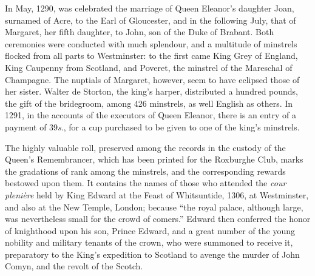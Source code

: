 In May, 1290, was celebrated the marriage of Queen Eleanor’s daughter Joan,
surnamed of Acre, to the Earl of Gloucester, and in the following July, that of
Margaret, her fifth daughter, to John, son of the Duke of Brabant. Both ceremonies
were conducted with much splendour, and a multitude of minstrels flocked
from all parts to Westminster: to the first came King Grey of England, King
Caupenny from Scotland, and Poveret, the minstrel of the Mareschal of Champagne.
The nuptials of Margaret, however, seem to have eclipsed those of her sister. 
Walter de Storton, the king’s harper, \pagebreak
distributed a hundred pounds, the gift of 
the bridegroom, among 426 minstrels, as well English as others. %
 In 1291, in the
accounts of the executors of Queen Eleanor, there is an entry of a payment of
39\textit{s}., for a cup purchased to be given to one of the king’s minstrels.



The highly valuable roll, preserved among the records in the custody of the
Queen’s Remembrancer, which has been printed for the Roxburghe Club, marks
the gradations of rank among the minstrels, and the corresponding rewards
bestowed upon them. It contains the names of those who attended the \textit{cour
plenière} held by King Edward at the Feast of Whitsuntide, 1306, at Westminster,
and also at the New Temple, London; because “the royal palace,
although large, was nevertheless small for the crowd of comers.” Edward then
conferred the honor of knighthood upon his son, Prince Edward, and a great
number of the young nobility and military tenants of the crown, who were summoned
to receive it, preparatory to the King’s expedition to Scotland to avenge
the murder of John Comyn, and the revolt of the Scotch.

